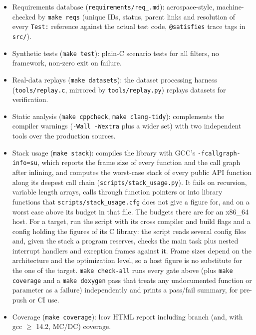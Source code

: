 \documentclass[11pt,a4paper]{article}
\newcommand{\code}[1]{\texttt{#1}}
\begin{document}
\begin{itemize}
  \item Requirements database (\code{requirements/req\_\allowbreak*.md}):
    aerospace-style, machine-checked by \code{make reqs} (unique IDs,
    status, parent links and resolution of every \code{Test:}
    reference against the actual test code, \code{@satisfies} trace
    tags in \code{src/}).
  \item Synthetic tests (\code{make test}): plain-C scenario
    tests for all filters, no framework, non-zero exit on failure.
  \item Real-data replays (\code{make datasets}): the
    dataset processing harness (\code{tools/replay.c}, mirrored by
    \code{tools/replay.py}) replays datasets for verification.
  \item Static analysis (\code{make cppcheck}, \code{make
    clang-tidy}): complements the compiler warnings (\code{-Wall -Wextra} plus
    a wider set) with two independent tools over the production sources.
  \item Stack usage (\code{make stack}): compiles the library with
    GCC's \code{-fcallgraph-info=su}, which reports the frame size of every
    function and the call graph after inlining, and computes the worst-case
    stack of every public API function along its deepest call chain
    (\code{scripts/stack\_usage.py}). It fails on recursion, variable length
    arrays, calls through function pointers or into library functions that
    \code{scripts/stack\_usage.cfg} does not give a figure for, and on a
    worst case above its budget in that file. The budgets there are for an
    x86\_64 host. For a target, run the script with its cross compiler and
    build flags and a config holding the figures of its C library: the
    script reads several config files and, given the stack a program
    reserves, checks the main task plus nested interrupt handlers and
    exception frames against it. Frame sizes depend on the architecture and
    the optimization level, so a host figure is no substitute for the
    one of the target.
    \code{make check-all} runs every gate above (plus \code{make coverage}
    and a \code{make doxygen} pass that treats any undocumented function or
    parameter as a failure) independently and prints a pass/fail summary,
    for pre-push or CI use.
  \item Coverage (\code{make coverage}): lcov HTML report
    including branch (and, with gcc $\ge$ 14.2, MC/DC) coverage.
\end{itemize}
\end{document}
